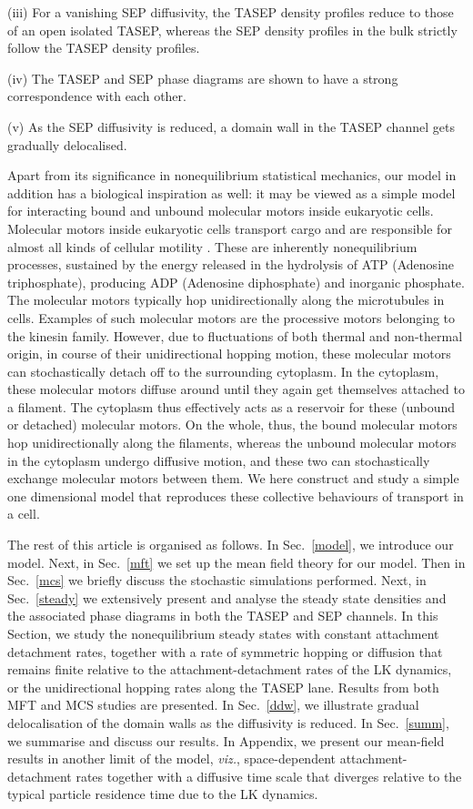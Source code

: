 \documentclass[aps,pre,twocolumn,superscriptaddress,amsmath,amssymb,longbibliography,floatfix]{revtex4}
\begin{document}
(iii) For a vanishing SEP diffusivity, the TASEP density profiles reduce to those of an open isolated TASEP, whereas the SEP density profiles in the bulk strictly follow the TASEP density profiles.

(iv) The TASEP and SEP phase diagrams are shown to have a strong correspondence with each other.

(v) As the SEP diffusivity is reduced, a domain wall in the TASEP channel gets gradually delocalised.

Apart from its  significance in nonequilibrium statistical mechanics,
our model in addition has a biological inspiration as well: it may be viewed
as a simple model for interacting bound and unbound molecular motors
inside eukaryotic cells. Molecular motors inside eukaryotic cells transport cargo and are responsible for almost 
all kinds of cellular motility \cite{motor}.
These are inherently nonequilibrium processes, sustained by 
the energy released in the hydrolysis of
ATP (Adenosine triphosphate), producing ADP (Adenosine 
diphosphate) and inorganic phosphate.
The molecular motors typically hop  unidirectionally
along the microtubules in cells. Examples of
 such molecular motors are the processive motors belonging to the kinesin 
family. However, due to fluctuations of both thermal and non-thermal
origin,  in course of their unidirectional 
hopping motion, these molecular motors can stochastically detach off to the surrounding cytoplasm.
In the cytoplasm, these molecular motors  
diffuse around until they again get themselves attached to a filament.
The cytoplasm thus effectively acts as a reservoir for these (unbound or detached) 
molecular motors. On the whole, thus, the bound molecular 
motors hop unidirectionally along the filaments, whereas the unbound 
molecular motors in the cytoplasm undergo diffusive motion, and these two
can stochastically exchange molecular motors between them. We here construct and study a simple one dimensional model that reproduces these collective 
behaviours of transport in a cell.



The rest of this article is organised as follows. In Sec.~\ref{model}, we introduce our model. Next, in Sec.~\ref{mft} we set up the mean field theory for our model. Then in Sec.~\ref{mcs} we briefly discuss the stochastic simulations performed. Next, in Sec.~\ref{steady} we extensively present and analyse the steady state densities and the associated phase diagrams in both the TASEP and SEP channels. In this Section, we  study the nonequilibrium steady states with constant attachment detachment rates, together with a rate of symmetric hopping or diffusion that remains finite relative to the attachment-detachment rates of the LK dynamics, or the unidirectional hopping rates along the TASEP lane. Results from both MFT and MCS studies are presented. In Sec.~\ref{ddw}, we illustrate gradual delocalisation of the domain walls as the diffusivity is reduced. In Sec.~\ref{summ}, we summarise and discuss our results. In Appendix, we present  our mean-field results in another limit of the model, {\em viz.}, space-dependent attachment-detachment rates together with a diffusive time scale that diverges relative to the typical particle residence time due to the LK dynamics.
\end{document}
